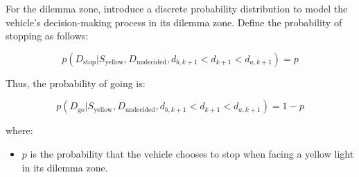 For the dilemma zone, introduce a discrete probability distribution to model the vehicle's decision-making process in its dilemma zone. Define the probability of stopping as follows:

\begin{equation}
    p(D_{\text{stop}} | S_{\text{yellow}}, D_\text{undecided}, d_{b, k+1} < d_{k+1} < d_{a, k+1}) = p
\end{equation}

Thus, the probability of going is:

\begin{equation}
    p(D_{\text{go}} | S_{\text{yellow}}, D_\text{undecided}, d_{b, k+1} < d_{k+1} < d_{a, k+1}) = 1 - p
\end{equation}

where:
\begin{itemize}
    \item \(p\) is the probability that the vehicle chooses to stop when facing a yellow light in its dilemma zone.
\end{itemize}

